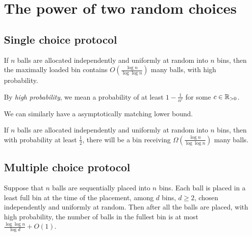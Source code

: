 \section{The power of two random choices}

\subsection{Single choice protocol}

\begin{theorem}
    If $n$ balls are allocated independently and uniformly at random into $n$ bins, then the maximally loaded bin contains $O\left(\tfrac{\log n}{\log\log n}\right)$ many balls, with high probability.    
\end{theorem}

By \emph{high probability}, we mean a probability of at least $1 - \tfrac{1}{n^c}$ for some $c \in \mathbb R_{> 0}$.

We can similarly have a asymptotically matching lower bound.

\begin{theorem}
    If $n$ balls are allocated independently and uniformly at random into $n$ bins, then with probability at least $\tfrac12$, there will be a bin receiving $\Omega\left(\tfrac{\log n}{\log\log n}\right)$ many balls.
\end{theorem}

\subsection{Multiple choice protocol}

\begin{theorem}
    Suppose that $n$ balls are sequentially placed into $n$ bins. Each ball is placed in a least full bin at the time of the placement, among $d$ bins, $d \geq 2$, chosen independently and uniformly at random. Then after all the balls are placed, with high probability, the number of balls in the fullest bin is at most $\tfrac{\log\log n}{\log d} + O(1)$.
\end{theorem}

